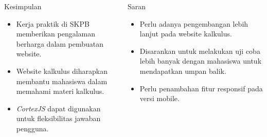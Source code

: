 \documentclass[aspectratio=169,t,xcolor=table]{beamer}
\begin{document}
\begin{frame}
    \begin{columns}
            \begin{block}{Kesimpulan}
                \begin{itemize}
                    \item Kerja praktik di SKPB memberikan pengalaman berharga dalam pembuatan website.
                    \item Website kalkulus diharapkan membantu mahasiswa dalam memahami materi kalkulus.
                    \item \textit{CortexJS} dapat digunakan untuk fleksibilitas jawaban pengguna.
                \end{itemize}
            \end{block}
            \begin{block}{Saran}
                \begin{itemize}
                    \item Perlu adanya pengembangan lebih lanjut pada website kalkulus.
                    \item Disarankan untuk melakukan uji coba lebih banyak dengan mahasiswa untuk mendapatkan umpan balik.
                    \item Perlu penambahan fitur responsif pada versi mobile.
                \end{itemize}
            \end{block}
    \end{columns}
\end{frame}


\end{document}
